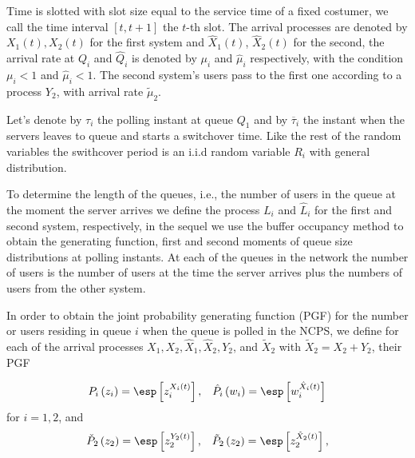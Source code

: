 Time is slotted with slot size equal to the service time of a fixed costumer, we call the time interval $\left[t,t+1\right]$ the $t$-th slot. The arrival processes are denoted by $X_{1}\left(t\right),X_{2}\left(t\right)$ for the first system and $\hat{X}_{1}\left(t\right)$, $\hat{X}_{2}\left(t\right)$ for the second, the arrival rate at $Q_{i}$ and $\hat{Q}_{i}$ is denoted by $\mu_{i}$ and $\hat{\mu}_{i}$ respectively, with the condition $\mu_{i}<1$ and $\hat{\mu}_{i}<1$. The second system's users pass to the first one according to a process $Y_{2}$, with arrival rate $\tilde{\mu}_{2}$. 

Let's denote by $\tau_{i}$ the polling instant at queue $Q_{1}$ and by $\overline{\tau}_{i}$ the instant when the servers leaves to queue and starts a switchover time. Like the rest of the random variables the swithcover period is an i.i.d random variable $R_{i}$ with general distribution. 


To determine the length of the queues, i.e., the number of users in the queue at the moment the server arrives we define the process $L_{i}$ and $\hat{L}_{i}$ for the first and second system, respectively, in the sequel we use the buffer occupancy method to obtain the generating function, first and second moments of queue size distributions at polling instants. At each of the queues in the network the number of users is the number of users at the time the server arrives plus the numbers of users from the other system. 


In order to obtain the joint probability generating function (PGF) for the number or users residing in queue $i$ when the queue is polled in the NCPS, we define for each of the arrival processes $X_{1},X_{2},\hat{X}_{1},\hat{X}_{2},Y_{2}$, and $\tilde{X}_{2}$ with $\tilde{X}_{2}=X_{2}+Y_{2}$, their PGF

\begin{eqnarray*}
\begin{array}{cc}
P_{i}\left(z_{i}\right)=\esp\left[z_{i}^{X_{i}\left(t\right)}\right],&
\hat{P}_{i}\left(w_{i}\right)=\esp\left[w_{i}^{\hat{X}_{i}\left(t\right)}\right]
\end{array}
\end{eqnarray*}
for $i=1,2$, and
\begin{eqnarray*}
\begin{array}{cc}
\check{P}_{2}\left(z_{2}\right)=\esp\left[z_{2}^{Y_{2}\left(t\right)}\right],& \tilde{P}_{2}\left(z_{2}\right)=\esp\left[z_{2}^{\tilde{X}_{2}\left(t\right)}
\right],
\end{array}
\end{eqnarray*}

